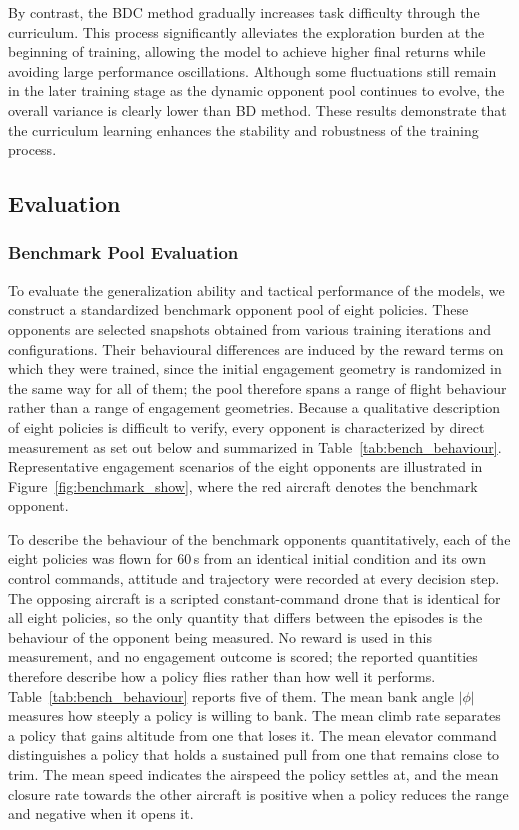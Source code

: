 \documentclass[pdflatex,sn-mathphys-num]{sn-jnl}%
\theoremstyle{thmstyleone}%
\theoremstyle{thmstyletwo}%
\theoremstyle{thmstylethree}%
\begin{document}
By contrast, the BDC method gradually increases task difficulty through the curriculum. This process significantly alleviates the exploration burden at the beginning of training, allowing the model to achieve higher final returns while avoiding large performance oscillations. Although some fluctuations still remain in the later training stage as the dynamic opponent pool continues to evolve, the overall variance is clearly lower than BD method. These results demonstrate that the curriculum learning enhances the stability and robustness of the training process.


\subsection{Evaluation}

\subsubsection{Benchmark Pool Evaluation}
\label{sec:eval_benchmark}

To evaluate the generalization ability and tactical performance of the models, we construct a standardized benchmark opponent pool of eight policies. These opponents are selected snapshots obtained from various training iterations and configurations. Their behavioural differences are induced by the reward terms on which they were trained, since the initial engagement geometry is randomized in the same way for all of them; the pool therefore spans a range of flight behaviour rather than a range of engagement geometries. Because a qualitative description of eight policies is difficult to verify, every opponent is characterized by direct measurement as set out below and summarized in Table~\ref{tab:bench_behaviour}. Representative engagement scenarios of the eight opponents are illustrated in Figure~\ref{fig:benchmark_show}, where the red aircraft denotes the benchmark opponent.

To describe the behaviour of the benchmark opponents quantitatively, each of the eight policies was flown for $60$\,s from an identical initial condition and its own control commands, attitude and trajectory were recorded at every decision step. The opposing aircraft is a scripted constant-command drone that is identical for all eight policies, so the only quantity that differs between the episodes is the behaviour of the opponent being measured. No reward is used in this measurement, and no engagement outcome is scored; the reported quantities therefore describe how a policy flies rather than how well it performs. Table~\ref{tab:bench_behaviour} reports five of them. The mean bank angle $|\phi|$ measures how steeply a policy is willing to bank. The mean climb rate separates a policy that gains altitude from one that loses it. The mean elevator command distinguishes a policy that holds a sustained pull from one that remains close to trim. The mean speed indicates the airspeed the policy settles at, and the mean closure rate towards the other aircraft is positive when a policy reduces the range and negative when it opens it.
\end{document}
